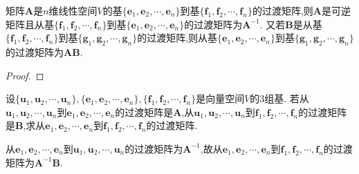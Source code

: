 \documentclass[../../main.tex]{subfiles}%
\begin{document}
\begin{theorem}\label{theorem:两次基变换后的过渡矩阵}
矩阵\(\boldsymbol{A}\)是\(n\)维线性空间\(V\)的基\(\{\boldsymbol{e}_1,\boldsymbol{e}_2,\cdots,\boldsymbol{e}_n\}\)到基\(\{\boldsymbol{f}_1,\boldsymbol{f}_2,\cdots,\boldsymbol{f}_n\}\)的过渡矩阵,则\(\boldsymbol{A}\)是可逆矩阵且从基\(\{\boldsymbol{f}_1,\boldsymbol{f}_2,\cdots,\boldsymbol{f}_n\}\)到基\(\{\boldsymbol{e}_1,\boldsymbol{e}_2,\cdots,\boldsymbol{e}_n\}\)的过渡矩阵为\(\boldsymbol{A}^{-1}\). 又若\(\boldsymbol{B}\)是从基\(\{\boldsymbol{f}_1,\boldsymbol{f}_2,\cdots,\boldsymbol{f}_n\}\)到基\(\{\boldsymbol{g}_1,\boldsymbol{g}_2,\cdots,\boldsymbol{g}_n\}\)的过渡矩阵,则从基\(\{\boldsymbol{e}_1,\boldsymbol{e}_2,\cdots,\boldsymbol{e}_n\}\)到基\(\{\boldsymbol{g}_1,\boldsymbol{g}_2,\cdots,\boldsymbol{g}_n\}\)的过渡矩阵为\(\boldsymbol{A}\boldsymbol{B}\).
\end{theorem}
\begin{proof}

\end{proof}

\begin{example}
设\(\{\boldsymbol{u}_1,\boldsymbol{u}_2,\cdots,\boldsymbol{u}_n\},\{\boldsymbol{e}_1,\boldsymbol{e}_2,\cdots,\boldsymbol{e}_n\},\{\boldsymbol{f}_1,\boldsymbol{f}_2,\cdots,\boldsymbol{f}_n\}\)是向量空间\(V\)的3组基. 若从\(\boldsymbol{u}_1,\boldsymbol{u}_2,\cdots,\boldsymbol{u}_n\)到\(\boldsymbol{e}_1,\boldsymbol{e}_2,\cdots,\boldsymbol{e}_n\)的过渡矩阵是\(\boldsymbol{A}\),从\(\boldsymbol{u}_1,\boldsymbol{u}_2,\cdots,\boldsymbol{u}_n\)到\(\boldsymbol{f}_1,\boldsymbol{f}_2,\cdots,\boldsymbol{f}_n\)的过渡矩阵是\(\boldsymbol{B}\),求从\(\boldsymbol{e}_1,\boldsymbol{e}_2,\cdots,\boldsymbol{e}_n\)到\(\boldsymbol{f}_1,\boldsymbol{f}_2,\cdots,\boldsymbol{f}_n\)的过渡矩阵.
\end{example}
\begin{solution}
从\(\boldsymbol{e}_1,\boldsymbol{e}_2,\cdots,\boldsymbol{e}_n\)到\(\boldsymbol{u}_1,\boldsymbol{u}_2,\cdots,\boldsymbol{u}_n\)的过渡矩阵为\(\boldsymbol{A}^{-1}\),故从\(\boldsymbol{e}_1,\boldsymbol{e}_2,\cdots,\boldsymbol{e}_n\)到\(\boldsymbol{f}_1,\boldsymbol{f}_2,\cdots,\boldsymbol{f}_n\)的过渡矩阵为\(\boldsymbol{A}^{-1}\boldsymbol{B}\).


\end{solution}
\end{document}
